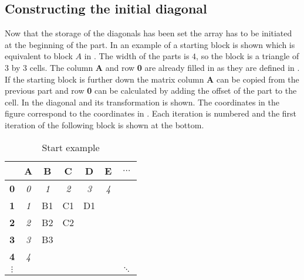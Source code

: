 


\subsection{Constructing the initial diagonal} \label{section:initial}
Now that the storage of the diagonals has been set the array has to be initiated at the beginning of the part.
In  an example of a starting block is shown which is equivalent to block $A$ in .
The width of the parts is $4$, so the block is a triangle of $3$ by $3$ cells.
The column \textbf{A} and row \textbf{0} are already filled in as they are defined in .
If the starting block is further down the matrix column \textbf{A} can be copied from the previous part and row \textbf{0} can be calculated by adding the offset of the part to the cell.
In  the diagonal and its transformation is shown.
The coordinates in the figure correspond to the coordinates in .
Each iteration is numbered and the first iteration of the following block is shown at the bottom.

{\newcommand\C[0]{\cellcolor{gray}}
\begin{table}
\centering \large
\begin{tabular}{|c|c||c|c|c|c||c} \hline
           & \textbf{A} & \textbf{B} & \textbf{C} & \textbf{D} & \textbf{E} & $\dotsc$ \\ \hline
\textbf{0} & \textit{0} & \textit{1} & \textit{2} & \textit{3} & \textit{4} &          \\ \hline \hline
\textbf{1} & \textit{1} & B1         & C1         & D1         & \C         &          \\ \hline
\textbf{2} & \textit{2} & B2         & C2         & \C         & \C         &          \\ \hline
\textbf{3} & \textit{3} & B3         & \C         & \C         & \C         &          \\ \hline
\textbf{4} & \textit{4} & \C         & \C         & \C         & \C         &          \\ \hline
$\vdots$   & \C         & \C         & \C         & \C         & \C         & $\ddots$ \\
\end{tabular}
\caption{Start example} \label{tstart}
\end{table}
}


